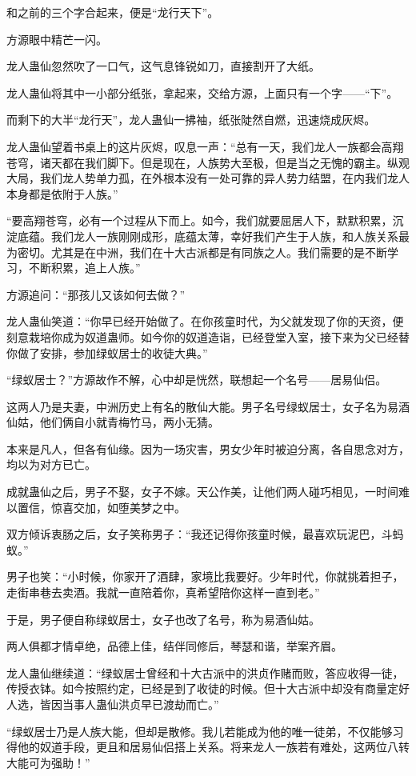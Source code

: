 \begin{this_body}
和之前的三个字合起来，便是“龙行天下”。

方源眼中精芒一闪。

龙人蛊仙忽然吹了一口气，这气息锋锐如刀，直接割开了大纸。

龙人蛊仙将其中一小部分纸张，拿起来，交给方源，上面只有一个字——“下”。

而剩下的大半“龙行天”，龙人蛊仙一拂袖，纸张陡然自燃，迅速烧成灰烬。

龙人蛊仙望着书桌上的这片灰烬，叹息一声：“总有一天，我们龙人一族都会高翔苍穹，诸天都在我们脚下。但是现在，人族势大至极，但是当之无愧的霸主。纵观大局，我们龙人势单力孤，在外根本没有一处可靠的异人势力结盟，在内我们龙人本身都是依附于人族。”

“要高翔苍穹，必有一个过程从下而上。如今，我们就要屈居人下，默默积累，沉淀底蕴。我们龙人一族刚刚成形，底蕴太薄，幸好我们产生于人族，和人族关系最为密切。尤其是在中洲，我们在十大古派都是有同族之人。我们需要的是不断学习，不断积累，追上人族。”

方源追问：“那孩儿又该如何去做？”

龙人蛊仙笑道：“你早已经开始做了。在你孩童时代，为父就发现了你的天资，便刻意栽培你成为奴道蛊师。如今你的奴道造诣，已经登堂入室，接下来为父已经替你做了安排，参加绿蚁居士的收徒大典。”

“绿蚁居士？”方源故作不解，心中却是恍然，联想起一个名号——居易仙侣。

这两人乃是夫妻，中洲历史上有名的散仙大能。男子名号绿蚁居士，女子名为易酒仙姑，他们俩自小就青梅竹马，两小无猜。

本来是凡人，但各有仙缘。因为一场灾害，男女少年时被迫分离，各自思念对方，均以为对方已亡。

成就蛊仙之后，男子不娶，女子不嫁。天公作美，让他们两人碰巧相见，一时间难以置信，惊喜交加，如堕美梦之中。

双方倾诉衷肠之后，女子笑称男子：“我还记得你孩童时候，最喜欢玩泥巴，斗蚂蚁。”

男子也笑：“小时候，你家开了酒肆，家境比我要好。少年时代，你就挑着担子，走街串巷去卖酒。我就一直陪着你，真希望陪你这样一直到老。”

于是，男子便自称绿蚁居士，女子也改了名号，称为易酒仙姑。

两人俱都才情卓绝，品德上佳，结伴同修后，琴瑟和谐，举案齐眉。

龙人蛊仙继续道：“绿蚁居士曾经和十大古派中的洪贞作赌而败，答应收得一徒，传授衣钵。如今按照约定，已经是到了收徒的时候。但十大古派中却没有商量定好人选，皆因当事人蛊仙洪贞早已渡劫而亡。”

“绿蚁居士乃是人族大能，但却是散修。我儿若能成为他的唯一徒弟，不仅能够习得他的奴道手段，更且和居易仙侣搭上关系。将来龙人一族若有难处，这两位八转大能可为强助！”


\end{this_body}
